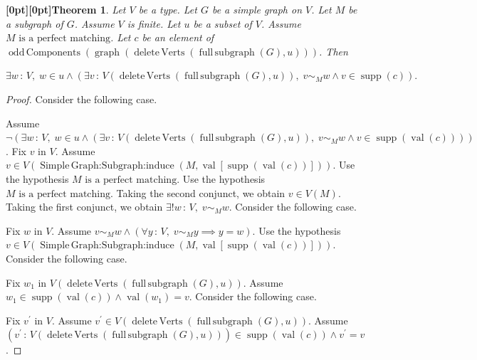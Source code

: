 \documentclass{article}
\makeatletter
\newcommand{\paperanchor}[1]{\hypertarget{#1}{}}%
\def\paperdest{\pdfextension dest}\def\paperstart{\pdfextension startlink}%
\def\paperend{\pdfextension endlink}\def\papercolor{\pdfextension colorstack}%
\let\paperdest\pdfdest\let\paperstart\pdfstartlink\let\paperend\pdfendlink\let\papercolor\pdfcolorstack
\newcommand{\paperanchor}[1]{\paperdest name{#1} xyz}%
\newcommand{\paperanchor}[1]{\special{pdf:dest (#1) [@thispage /XYZ null @ypos null]}}%
\newcommand{\paperlineanchor}[1]{\raisebox{10pt}[0pt][0pt]{\paperanchor{#1}}}
\DeclareRobustCommand{\paperresultname}[1]{\paperlineanchor{theorem:\arabic{theorem}}#1}
\theoremstyle{paperresult}
\newtheorem{theorem}{\paperresultname{Theorem}}
\newenvironment{proofstep}{\par\smallskip\ifdim\leftskip<3em\relax\advance\leftskip by 1em\relax\fi\noindent\ignorespaces}{\par\smallskip}
\makeatother
\begin{document}
\begin{theorem}\label{theorem:27}
Let \(V\) be a type. Let \(G\) be a simple graph on \(V\). Let \(M\) be a subgraph of \(G\). Assume \(V\) is finite. Let \(u\) be a subset of \(V\). Assume \(M\text{ is a perfect matching}\). Let \(c\) be an element of \(\operatorname{odd\,Components}(\operatorname{graph}(\operatorname{delete\,Verts}(\operatorname{full\,subgraph}(G),\allowbreak{} u)))\). Then
\begin{center}
\(\displaystyle \exists w\, :\, V,\; w \in u \land (\exists v\, :\, V(\operatorname{delete\,Verts}(\operatorname{full\,subgraph}(G),\allowbreak{} u)),\; v \sim_{M} w \land v \in \operatorname{supp}(c)).\)
\end{center}
\end{theorem}

\begin{proof}
Consider the following case.
\begin{proofstep}
Assume \(\neg (\exists w\, :\, V,\; w \in u \land (\exists v\, :\, V(\operatorname{delete\,Verts}(\operatorname{full\,subgraph}(G),\allowbreak{} u)),\; v \sim_{M} w \land v \in \operatorname{supp}(\operatorname{val}(c))))\).
Fix \(v\) in \(V\).
Assume \(v \in V(\operatorname{Simple\,Graph\mathord{:}Subgraph\mathord{:}induce}(M,\allowbreak{} \operatorname{val}[\operatorname{supp}(\operatorname{val}(c))]))\).
Use the hypothesis \(M\text{ is a perfect matching}\).
Use the hypothesis \(M\text{ is a perfect matching}\).
Taking the second conjunct, we obtain \(v \in V(M)\).
Taking the first conjunct, we obtain \(\exists! w\, :\, V,\; v \sim_{M} w\).
Consider the following case.
\begin{proofstep}
Fix \(w\) in \(V\).
Assume \(v \sim_{M} w \land \left(\forall y\, :\, V,\; v \sim_{M} y \implies y = w\right)\).
Use the hypothesis \(v \in V(\operatorname{Simple\,Graph\mathord{:}Subgraph\mathord{:}induce}(M,\allowbreak{} \operatorname{val}[\operatorname{supp}(\operatorname{val}(c))]))\).
Consider the following case.
\begin{proofstep}
Fix \(w_{1}\) in \(V(\operatorname{delete\,Verts}\left(\operatorname{full\,subgraph}(G), u\right))\).
Assume \(w_{1} \in \operatorname{supp}\left(\operatorname{val}(c)\right) \land \operatorname{val}(w_{1}) = v\).
Consider the following case.
\begin{proofstep}
Fix \(v^{'}\) in \(V\).
Assume \(v^{'} \in V(\operatorname{delete\,Verts}\left(\operatorname{full\,subgraph}(G), u\right))\).
Assume \((v^{'}\, :\, V(\operatorname{delete\,Verts}(\operatorname{full\,subgraph}(G),\allowbreak{} u))) \in \operatorname{supp}(\operatorname{val}(c)) \land v^{'} = v\).

\end{proofstep}
\end{proofstep}
\end{proofstep}
\end{proofstep}
\end{proof}
\end{document}
